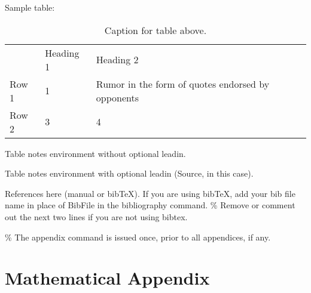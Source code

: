 \documentclass[AER]{AEA}
\begin{document}
Sample table:

\begin{table}
\caption{Caption for table above.}

\begin{tabular}{lll}
& Heading 1 & Heading 2 \\
Row 1 & 1 & Rumor in the form of quotes endorsed by opponents \\
Row 2 & 3 & 4%
\end{tabular}
\begin{tablenotes}
Table notes environment without optional leadin.
\end{tablenotes}
\begin{tablenotes}[Source]
Table notes environment with optional leadin (Source, in this case).
\end{tablenotes}
\end{table}

References here (manual or bibTeX). If you are using bibTeX, add your
bib file name in place of BibFile in the bibliography command. \% Remove
or comment out the next two lines if you are not using bibtex.




\% The appendix command is issued once, prior to all appendices, if any.
\appendix

\section{Mathematical Appendix}
\end{document}
